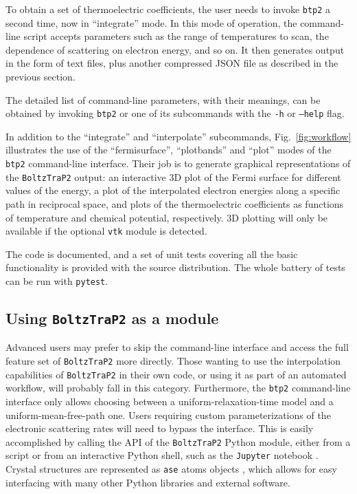 \documentclass[final,5p,times,twocolumn,sort&compress]{elsarticle}
\begin{document}
To obtain a set of thermoelectric coefficients, the user needs to invoke \texttt{btp2} a second time, now in ``integrate'' mode. In this mode of operation, the command-line script accepts parameters such as the range of temperatures to scan, the dependence of scattering on electron energy, and so on. It then generates output in the form of text files, plus another compressed JSON file as described in the previous section.

The detailed list of command-line parameters, with their meanings, can be obtained by invoking \texttt{btp2} or one of its subcommands with the \texttt{-h} or \texttt{--help} flag.

In addition to the ``integrate'' and ``interpolate'' subcommands, Fig.~\ref{fig:workflow} illustrates the use of the ``fermisurface'', ``plotbands'' and ``plot'' modes of the \texttt{btp2} command-line interface. Their job is to generate graphical representations of the \texttt{BoltzTraP2} output: an interactive 3D plot of the Fermi surface for different values of the energy, a plot of the interpolated electron energies along a specific path in reciprocal space, and plots of the thermoelectric coefficients as functions of temperature and chemical potential, respectively. 3D plotting will only be available if the optional \texttt{vtk} module is detected.

The code is documented, and a set of unit tests covering all the basic functionality is provided with the source distribution. The whole battery of tests can be run with \texttt{pytest}.

\subsection{Using \texttt{BoltzTraP2} as a module}

Advanced users may prefer to skip the command-line interface and access the full feature set of \texttt{BoltzTraP2} more directly. Those wanting to use the interpolation capabilities of \texttt{BoltzTraP2} in their own code, or using it as part of an automated workflow, will probably fall in this category. Furthermore, the \texttt{btp2} command-line interface only allows choosing between a uniform-relaxation-time model and a uniform-mean-free-path one. Users requiring custom parameterizations of the electronic scattering rates will need to bypass the interface. This is easily accomplished by calling the API of the \texttt{BoltzTraP2} Python module, either from a script or from an interactive Python shell, such as the \texttt{Jupyter} notebook \cite{ipython}. Crystal structures are represented as \texttt{ase} atoms objects \cite{ase}, which allows for easy interfacing with many other Python libraries and external software.
\end{document}
